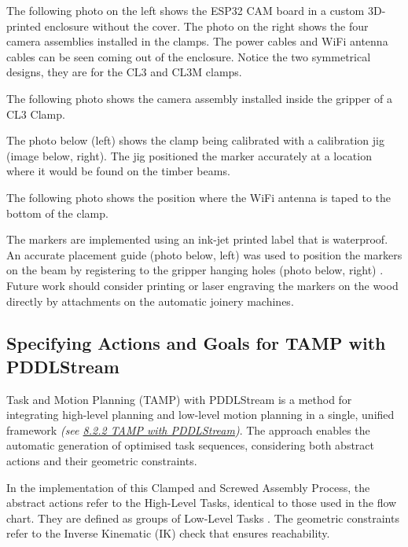 


The following photo on the left shows the ESP32 CAM board in a custom 3D-printed enclosure without the cover. The photo on the right shows the four camera assemblies installed in the clamps. The power cables and WiFi antenna cables can be seen coming out of the enclosure. Notice the two symmetrical designs, they are for the CL3 and CL3M clamps.




The following photo shows the camera assembly installed inside the gripper of a CL3 Clamp. 




The photo below (left) shows the clamp being calibrated with a calibration jig (image below, right). The jig positioned the marker accurately at a location where it would be found on the timber beams.




The following photo shows the position where the WiFi antenna is taped to the bottom of the clamp.




The markers are implemented using an ink-jet printed label that is waterproof. An accurate placement guide (photo below, left) was used to position the markers on the beam by registering to the gripper hanging holes (photo below, right) . Future work should consider printing or laser engraving the markers on the wood directly by attachments on the automatic joinery machines.




\subsection{Specifying Actions and Goals for TAMP with PDDLStream}
\label{subsection:exploration_5_specifying_actions_and_goals_for_tamp_with_pddlstream}

Task and Motion Planning (TAMP) with PDDLStream is a method for integrating high-level planning and low-level motion planning in a single, unified framework \textit{(see \ul{8.2.2 TAMP with PDDLStream})}. The approach enables the automatic generation of optimised task sequences, considering both abstract actions and their geometric constraints. 

In the implementation of this Clamped and Screwed Assembly Process, the abstract actions refer to the High-Level Tasks, identical to those used in the flow chart. They are defined as groups of Low-Level Tasks . The geometric constraints refer to the Inverse Kinematic (IK) check that ensures reachability. 

